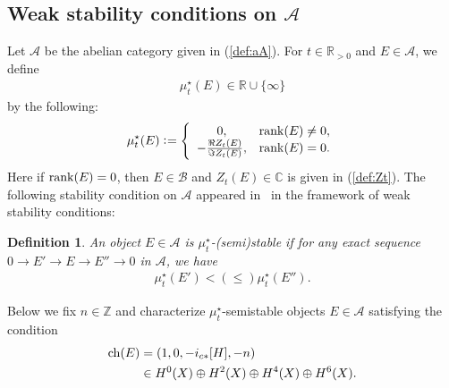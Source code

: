 \documentclass[11pt]{amsart}
\theoremstyle{plain}
\newtheorem{defi}[thm]{Definition}
\newcommand{\aA}{\mathcal{A}}
\newcommand{\bB}{\mathcal{B}}
\newcommand{\ch}{\mathop{\rm ch}\nolimits}
\newcommand{\rank}{\mathop{\rm rank}\nolimits}
\begin{document}
\subsection{Weak stability conditions on $\aA$}
Let $\aA$ be the abelian category 
given in (\ref{def:aA}). 
For $t \in \mathbb{R}_{>0}$
and $E \in \aA$, we define
\begin{align*}
\mu_t^{\star}(E) \in \mathbb{R} \cup \{\infty\}
\end{align*}
by the following: 
\begin{align*}
\mu_t^{\star}(E) \cneq \left\{ \begin{array}{cc}
0, & \rank(E)\neq 0, \\
-\frac{\Re Z_t(E)}{\Im Z_t(E)}, & 
\rank(E)=0. 
\end{array} \right.
\end{align*}
Here 
if $\rank(E)=0$, then $E \in \bB$ and 
$Z_t(E) \in \mathbb{C}$ is 
given in (\ref{def:Zt}). 
The following stability condition on $\aA$ 
appeared in~\cite{TodK3} in 
the framework of weak stability conditions: 
\begin{defi}
An object $E \in \aA$ is $\mu_t^{\star}$-(semi)stable 
if for any exact sequence $0 \to E' \to E \to E'' \to 0$
in $\aA$, we have
\begin{align*}
\mu_t^{\star}(E')<(\le) \mu_t^{\star}(E'').
\end{align*}
\end{defi}
Below 
we fix $n \in \mathbb{Z}$ and 
characterize 
$\mu_t^{\star}$-semistable 
objects $E \in \aA$ satisfying
the condition
\begin{align}\label{cond:ch}
\ch(E) &=(1, 0, -i_{c\ast}[H], -n) \\
\notag
& \in H^0(X) \oplus H^2(X) \oplus 
H^4(X) \oplus H^6(X). 
\end{align}
\end{document}
